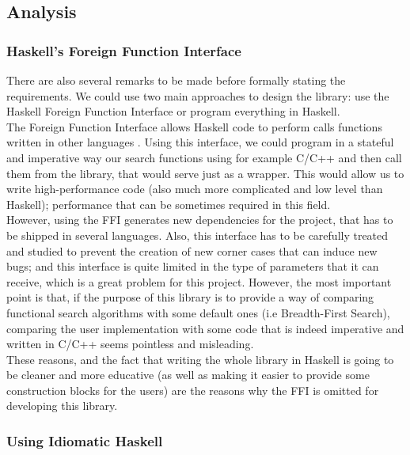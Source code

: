 \subsection{Analysis}

\subsubsection{Haskell's Foreign Function Interface}

There are also several remarks to be made before formally stating the
requirements. We could use two main approaches to design the library: use the
Haskell Foreign Function Interface or program everything in Haskell.\\

The Foreign Function Interface allows Haskell code to perform calls functions
written in other languages \cite{haskell98-ffi}. Using this interface, we could
program in a stateful and imperative way our search functions using for example
C/C++ and then call them from the library, that would serve just as a wrapper.
This would allow us to write high-performance code (also much more complicated
and low level than Haskell); performance that can be sometimes required in
this field.\\

However, using the FFI generates new dependencies for the project, that has to
be shipped in several languages. Also, this interface has to be carefully
treated and studied to prevent the creation of new corner cases that can induce
new bugs; and this interface is quite limited in the type of parameters that it
can receive, which is a great problem for this project. However, the most
important point is that, if the purpose of this library is to provide a way of
comparing functional search algorithms with some default ones (i.e
Breadth-First Search), comparing the user implementation with some code that is
indeed imperative and written in C/C++ seems pointless and misleading.\\

These reasons, and the fact that writing the whole library in Haskell is going
to be cleaner and more educative (as well as making it easier to provide some
construction blocks for the users) are the reasons why the FFI is omitted for
developing this library.\\

\subsubsection{Using Idiomatic Haskell}

